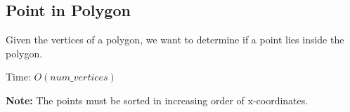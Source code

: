 \subsection{Point in Polygon}

Given the vertices of a polygon, we want to determine if a point lies inside the polygon.

Time: $O(num\_vertices)$

\textbf{ Note: } The points must be sorted in increasing order of x-coordinates.

